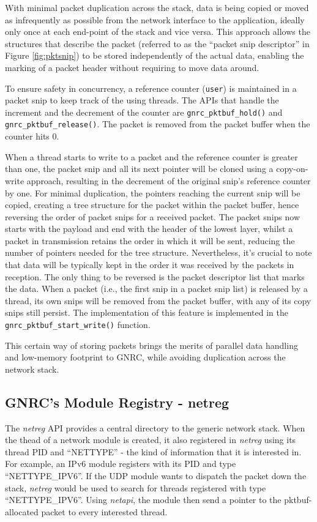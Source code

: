   With minimal packet duplication across the stack, data is being copied or moved as 
  infrequently as possible from the network interface to the application, ideally only once at each
  end-point of the stack and vice versa. This approach allows the structures that describe the packet 
  (referred to as the ``packet snip descriptor'' in Figure \ref{fig:pktsnip}) to be stored 
  independently of the actual data, enabling the marking of a packet header without requiring 
  to move data around.

  To ensure safety in concurrency, a reference counter (\texttt{user}) is maintained in a packet
  snip to keep track of the using threads. The APIs that handle the increment and the decrement of
  the counter are \texttt{gnrc{\_}pktbuf{\_}hold()} and \texttt{gnrc{\_}pktbuf{\_}release()}. The packet is
  removed from the packet buffer when the counter hits 0.

  When a thread starts to write to a packet and the reference counter is greater than one, the packet
  snip and all its next pointer will be cloned using a copy-on-write approach, resulting in the decrement 
  of the original snip's reference counter by one. For minimal duplication, the pointers reaching the
  current snip will be copied, creating a tree structure for the packet within the packet buffer, hence
  reversing the order of packet snips for a received packet. The packet snips now starts with the payload
  and end with the header of the lowest layer, whilst a packet in transmission retains the order 
  in which it will be sent, reducing the number of pointers needed for the tree structure. Nevertheless,
  it's crucial to note that data will be typically kept in the order it was received by the packets
  in reception. The only thing to be reversed is the packet descriptor list that marks the data.
  When a packet (i.e., the first snip in a packet snip list) is released by a thread, its own 
  snips will be removed from the packet buffer, with any of its copy snips still persist.
  The implementation of this feature is implemented in the \texttt{gnrc{\_}pktbuf{\_}start{\_}write()}
  function.

  This certain way of storing packets brings the merits of parallel data handling and low-memory
  footprint to GNRC, while avoiding duplication across the network stack.

\subsection{GNRC's Module Registry - netreg}
  The \textit{netreg} API provides a central directory to the generic network stack. When the
  thead of a network module is created, it also registered in \textit{netreg} using its thread
  PID and ``NETTYPE'' - the kind of information that it is interested in. For example, an IPv6
  module registers with its PID and type ``NETTYPE{\_}IPV6''. If the UDP module wants to dispatch
  the packet down the stack, \textit{netreg} would be used to search for threads registered
  with type ``NETTYPE{\_}IPV6''. Using \textit{netapi}, the module then send a pointer to the pktbuf-allocated
  packet to every interested thread.

